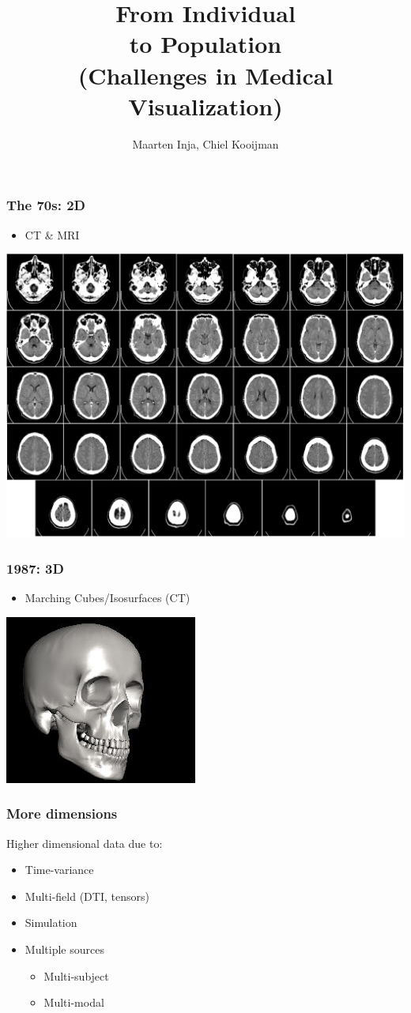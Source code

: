 \documentclass{beamer}
\title{From Individual\\to Population\\\Large (Challenges in Medical Visualization)}
\author{Maarten Inja, Chiel Kooijman}
\begin{document}
\begin{frame}
	\maketitle
\end{frame}

\begin{frame}
	\frametitle{The 70s: 2D}
	\begin{itemize}
		\item CT \& MRI
	\end{itemize}
	\begin{center}
		\includegraphics[width=.6\textwidth]{images/ct}
	\end{center}
\end{frame}

\begin{frame}
	\frametitle{1987: 3D}
	\begin{itemize}
		\item Marching Cubes/Isosurfaces (CT)
	\end{itemize}
	\begin{center}
		\includegraphics[width=.4\textwidth,height=.4\textheight]{images/marching}
	\end{center}
\end{frame}

\begin{frame}
	\frametitle{More dimensions}
	Higher dimensional data due to:
	\begin{itemize}
		\item Time-variance
		\item Multi-field (DTI, tensors)
		\item Simulation
		\item Multiple sources
			\begin{itemize}
				\item Multi-subject
				\item Multi-modal
			\end{itemize}
	\end{itemize}
\end{frame}
\end{document}

